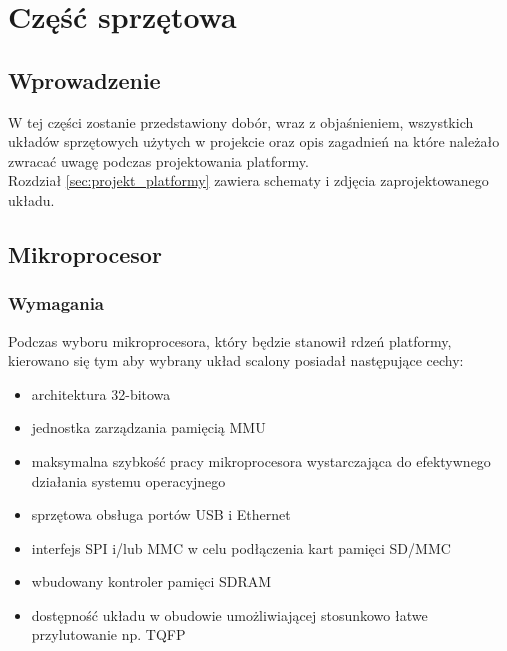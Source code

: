 \documentclass[a4paper,12pt]{book}
\begin{document}

	\chapter{Część sprzętowa}
		\section{Wprowadzenie}
			W tej części zostanie przedstawiony dobór, wraz z objaśnieniem, wszystkich układów sprzętowych użytych w projekcie oraz opis zagadnień na które należało zwracać uwagę podczas projektowania platformy.\\
			Rozdział \ref{sec:projekt_platformy} zawiera schematy i zdjęcia zaprojektowanego układu.
		\section{Mikroprocesor}
			\subsection{Wymagania}
				Podczas wyboru mikroprocesora, który będzie stanowił rdzeń platformy, kierowano się tym aby wybrany układ scalony posiadał następujące cechy:
				\begin{itemize}
					\item architektura 32-bitowa
					\item jednostka zarządzania pamięcią MMU
					\item maksymalna szybkość pracy mikroprocesora wystarczająca do efektywnego działania systemu operacyjnego
					\item sprzętowa obsługa portów USB i Ethernet
					\item interfejs SPI i/lub MMC w celu podłączenia kart pamięci SD/MMC
					\item wbudowany kontroler pamięci SDRAM
					\item dostępność układu w obudowie umożliwiającej stosunkowo łatwe przylutowanie np. TQFP
				\end{itemize}
\end{document}
